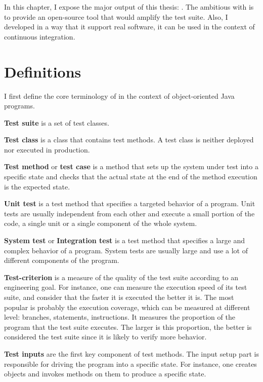 In this chapter, I expose the major output of this thesis: \dspot.
The ambitious with \dspot is to provide an open-source tool that would amplify the test suite.
Also, I developed \dspot in a way that it support real software, it can be used in the context of continuous integration.

\section{Definitions}
\label{sec:dspot:definitions}

I first define the core terminology of \dspot in the context of object-oriented Java programs.

\textbf{Test suite} is a set of test classes.

\textbf{Test class} is a class that contains test methods. 
A test class is neither deployed nor executed in production.

\textbf{Test method} or \textbf{test case} is a method that sets up the system under test into a specific state and checks that the actual state at the end of the method execution is the expected state.

\textbf{Unit test} is a test method that specifies a targeted behavior of a program. 
Unit tests are usually independent from each other and execute a small portion of the code, \ie a single unit or a single component of the whole system.

\textbf{System test} or \textbf{Integration test} is a test method that specifies a large and complex behavior of a program.
System tests are usually large and use a lot of different components of the program.

\textbf{Test-criterion} is a measure of the quality of the test suite according to an engineering goal.
For instance, one can measure the execution speed of its test suite, and consider that the faster it is executed the better it is.
The most popular is probably the execution coverage, which can be measured at different level: branches, statements, instructions.
It measures the proportion of the program that the test suite executes.
The larger is this proportion, the better is considered the test suite since it is likely to verify more behavior.

\textbf{Test inputs} are the first key component of test methods. 
The input setup part is responsible for driving the program into a specific state.
For instance, one creates objects and invokes methods on them to produce a specific state.

